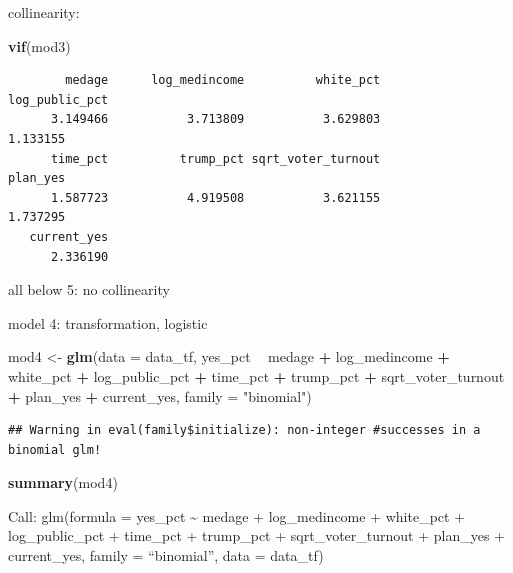 \documentclass[
]{article}
\newenvironment{Shaded}{\begin{snugshade}}{\end{snugshade}}
\newcommand{\DataTypeTok}[1]{\textcolor[rgb]{0.13,0.29,0.53}{#1}}
\newcommand{\KeywordTok}[1]{\textcolor[rgb]{0.13,0.29,0.53}{\textbf{#1}}}
\newcommand{\NormalTok}[1]{#1}
\newcommand{\OperatorTok}[1]{\textcolor[rgb]{0.81,0.36,0.00}{\textbf{#1}}}
\newcommand{\StringTok}[1]{\textcolor[rgb]{0.31,0.60,0.02}{#1}}
\begin{document}
collinearity:

\begin{Shaded}
\begin{Highlighting}[]
\KeywordTok{vif}\NormalTok{(mod3)}
\end{Highlighting}
\end{Shaded}

\begin{verbatim}
        medage      log_medincome          white_pct     log_public_pct 
      3.149466           3.713809           3.629803           1.133155 
      time_pct          trump_pct sqrt_voter_turnout           plan_yes 
      1.587723           4.919508           3.621155           1.737295 
   current_yes 
      2.336190 
\end{verbatim}

all below 5: no collinearity

model 4: transformation, logistic

\begin{Shaded}
\begin{Highlighting}[]
\NormalTok{mod4 <-}\StringTok{ }\KeywordTok{glm}\NormalTok{(}\DataTypeTok{data =}\NormalTok{ data_tf, yes_pct }\OperatorTok{~}\StringTok{ }\NormalTok{medage }\OperatorTok{+}\StringTok{ }\NormalTok{log_medincome }\OperatorTok{+}\StringTok{ }\NormalTok{white_pct }
           \OperatorTok{+}\StringTok{ }\NormalTok{log_public_pct }\OperatorTok{+}\StringTok{ }\NormalTok{time_pct }\OperatorTok{+}\StringTok{ }\NormalTok{trump_pct }\OperatorTok{+}\StringTok{ }\NormalTok{sqrt_voter_turnout }\OperatorTok{+}
\StringTok{              }\NormalTok{plan_yes }\OperatorTok{+}\StringTok{ }\NormalTok{current_yes, }\DataTypeTok{family =} \StringTok{"binomial"}\NormalTok{)}
\end{Highlighting}
\end{Shaded}

\begin{verbatim}
## Warning in eval(family$initialize): non-integer #successes in a binomial glm!
\end{verbatim}

\begin{Shaded}
\begin{Highlighting}[]
\KeywordTok{summary}\NormalTok{(mod4)}
\end{Highlighting}
\end{Shaded}

Call: glm(formula = yes\_pct \textasciitilde{} medage + log\_medincome +
white\_pct + log\_public\_pct + time\_pct + trump\_pct +
sqrt\_voter\_turnout + plan\_yes + current\_yes, family = ``binomial'',
data = data\_tf)
\end{document}
